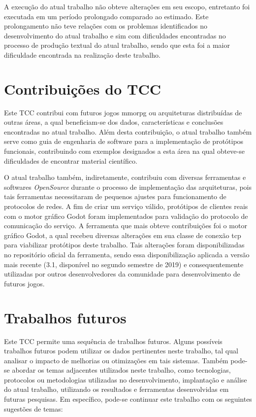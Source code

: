 A execução do atual trabalho não obteve alterações em seu escopo, entretanto foi executada em um período prolongado comparado ao estimado.
%
Este prolongamento não teve relações com os problemas identificados no desenvolvimento do atual trabalho e sim com dificuldades encontradas no processo de produção textual do atual trabalho, sendo que esta foi a maior dificuldade encontrada na realização deste trabalho.

\section{Contribuições do TCC}

Este TCC contribui com futuros jogos \ac{mmorpg} ou arquiteturas distribuídas de outras áreas, a qual beneficiam-se dos dados, características e conclusões encontradas no atual trabalho.
%
Além desta contribuição, o atual trabalho também serve como guia de engenharia de software para a implementação de protótipos funcionais, contribuindo com exemplos designados a esta área na qual obteve-se dificuldades de encontrar material científico.

O atual trabalho também, indiretamente, contribuiu com diversas ferramentas e softwares \textit{OpenSource} durante o processo de implementação das arquiteturas, pois tais ferramentas necessitaram de pequenos ajustes para funcionamento de protocolos de redes.
%
A fim de criar um serviço válido, protótipos de clientes reais com o motor gráfico Godot foram implementados para validação do protocolo de comunicação do serviço.
%
A ferramenta que mais obteve contribuições foi o motor gráfico Godot, a qual recebeu diversas alterações em sua classe de conexão \ac{tcp} para viabilizar protótipos deste trabalho.
%
Tais alterações foram disponibilizadas no repositório oficial da ferramenta, sendo essa disponibilização aplicada a versão mais recente (3.1, disponível no segundo semestre de 2019) e consequentemente utilizadas por outros desenvolvedores da comunidade para desenvolvimento de futuros jogos.




\section{Trabalhos futuros}

Este TCC permite uma sequência de trabalhos futuros.
%
Alguns possíveis trabalhos futuros podem utilizar os dados pertinentes neste trabalho, tal qual analisar o impacto de melhorias ou otimizações em tais sistemas.
%
Também pode-se abordar os temas adjacentes utilizados neste trabalho, como tecnologias, protocolos ou metodologias utilizadas no desenvolvimento, implantação e análise do atual trabalho, utilizando os resultados e ferramentas desenvolvidas em futuras pesquisas.
%
Em específico, pode-se continuar este trabalho com os seguintes sugestões de temas:


